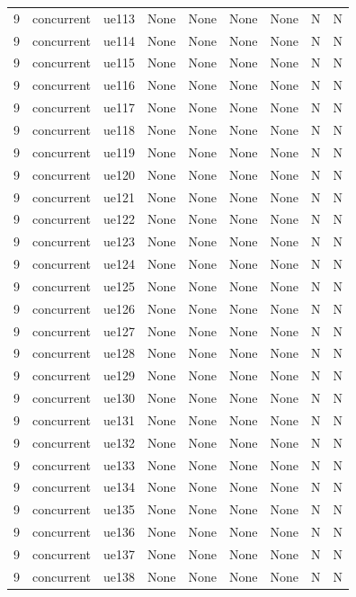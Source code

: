 \begin{table}[ht]
\begin{tabular}{|c|c|c|c|c|c|c|c|c|}
9 & concurrent & ue113 & None & None & None & None & N & N \\
9 & concurrent & ue114 & None & None & None & None & N & N \\
9 & concurrent & ue115 & None & None & None & None & N & N \\
9 & concurrent & ue116 & None & None & None & None & N & N \\
9 & concurrent & ue117 & None & None & None & None & N & N \\
9 & concurrent & ue118 & None & None & None & None & N & N \\
9 & concurrent & ue119 & None & None & None & None & N & N \\
9 & concurrent & ue120 & None & None & None & None & N & N \\
9 & concurrent & ue121 & None & None & None & None & N & N \\
9 & concurrent & ue122 & None & None & None & None & N & N \\
9 & concurrent & ue123 & None & None & None & None & N & N \\
9 & concurrent & ue124 & None & None & None & None & N & N \\
9 & concurrent & ue125 & None & None & None & None & N & N \\
9 & concurrent & ue126 & None & None & None & None & N & N \\
9 & concurrent & ue127 & None & None & None & None & N & N \\
9 & concurrent & ue128 & None & None & None & None & N & N \\
9 & concurrent & ue129 & None & None & None & None & N & N \\
9 & concurrent & ue130 & None & None & None & None & N & N \\
9 & concurrent & ue131 & None & None & None & None & N & N \\
9 & concurrent & ue132 & None & None & None & None & N & N \\
9 & concurrent & ue133 & None & None & None & None & N & N \\
9 & concurrent & ue134 & None & None & None & None & N & N \\
9 & concurrent & ue135 & None & None & None & None & N & N \\
9 & concurrent & ue136 & None & None & None & None & N & N \\
9 & concurrent & ue137 & None & None & None & None & N & N \\
9 & concurrent & ue138 & None & None & None & None & N & N \\

\end{tabular}
\end{table}
